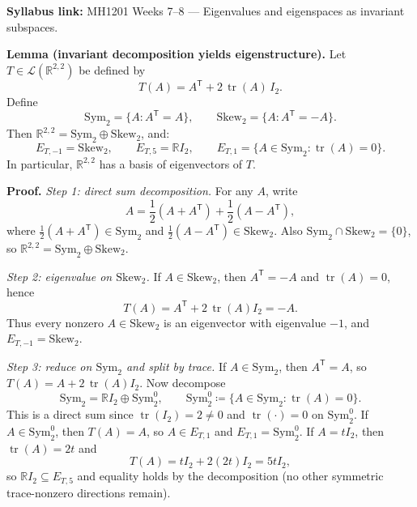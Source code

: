 \begin{extension}[title={Extension (Tutorial 7, Question 6, Method 2)}]
\textbf{Syllabus link:} MH1201 Weeks 7--8 — Eigenvalues and eigenspaces as invariant subspaces.

\textbf{Lemma (invariant decomposition yields eigenstructure).}
Let $T\in\mathcal{L}(\mathbb{R}^{2,2})$ be defined by
\[
T(A)=A^{\mathsf T}+2\,\operatorname{tr}(A)\,I_2.
\]
Define
\[
\mathrm{Sym}_2=\{A:A^{\mathsf T}=A\},\qquad \mathrm{Skew}_2=\{A:A^{\mathsf T}=-A\}.
\]
Then $\mathbb{R}^{2,2}=\mathrm{Sym}_2\oplus \mathrm{Skew}_2$, and:
\[
E_{T,-1}=\mathrm{Skew}_2,\qquad
E_{T,5}=\mathbb{R}I_2,\qquad
E_{T,1}=\{A\in\mathrm{Sym}_2:\operatorname{tr}(A)=0\}.
\]
In particular, $\mathbb{R}^{2,2}$ has a basis of eigenvectors of $T$.

\textbf{Proof.}
\emph{Step 1: direct sum decomposition.}
For any $A$, write
\[
A=\frac12(A+A^{\mathsf T})+\frac12(A-A^{\mathsf T}),
\]
where $\frac12(A+A^{\mathsf T})\in\mathrm{Sym}_2$ and $\frac12(A-A^{\mathsf T})\in\mathrm{Skew}_2$.
Also $\mathrm{Sym}_2\cap \mathrm{Skew}_2=\{0\}$, so $\mathbb{R}^{2,2}=\mathrm{Sym}_2\oplus\mathrm{Skew}_2$.

\emph{Step 2: eigenvalue on $\mathrm{Skew}_2$.}
If $A\in\mathrm{Skew}_2$, then $A^{\mathsf T}=-A$ and $\operatorname{tr}(A)=0$, hence
\[
T(A)=A^{\mathsf T}+2\,\operatorname{tr}(A)I_2=-A.
\]
Thus every nonzero $A\in\mathrm{Skew}_2$ is an eigenvector with eigenvalue $-1$, and $E_{T,-1}=\mathrm{Skew}_2$.

\emph{Step 3: reduce on $\mathrm{Sym}_2$ and split by trace.}
If $A\in\mathrm{Sym}_2$, then $A^{\mathsf T}=A$, so $T(A)=A+2\,\operatorname{tr}(A)I_2$.
Now decompose
\[
\mathrm{Sym}_2=\mathbb{R}I_2\oplus \mathrm{Sym}_2^0,\qquad \mathrm{Sym}_2^0\coloneqq\{A\in\mathrm{Sym}_2:\operatorname{tr}(A)=0\}.
\]
This is a direct sum since $\operatorname{tr}(I_2)=2\neq 0$ and $\operatorname{tr}(\cdot)=0$ on $\mathrm{Sym}_2^0$.
If $A\in\mathrm{Sym}_2^0$, then $T(A)=A$, so $A\in E_{T,1}$ and $E_{T,1}=\mathrm{Sym}_2^0$.
If $A=tI_2$, then $\operatorname{tr}(A)=2t$ and
\[
T(A)=tI_2+2(2t)I_2=5tI_2,
\]
so $\mathbb{R}I_2\subseteq E_{T,5}$ and equality holds by the decomposition (no other symmetric trace-nonzero directions remain).


\end{extension}
